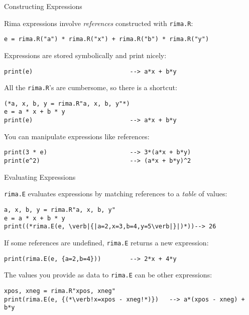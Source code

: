 \documentclass[smaller,handout]{beamer}
\begin{document}
\begin{frame}[fragile]{Constructing Expressions}

  Rima expressions involve \emph{references} constructed with \lstinline!rima.R!:
  \begin{lstlisting}
e = rima.R("a") * rima.R("x") + rima.R("b") * rima.R("y")
  \end{lstlisting}
  \pause

  Expressions are stored symbolically and print nicely:
  \begin{lstlisting}
print(e)                           --> a*x + b*y
  \end{lstlisting}
  \pause
  

  All the \lstinline!rima.R!'s are cumbersome, so there is a shortcut:
  \begin{lstlisting}
(*a, x, b, y = rima.R"a, x, b, y"*)
e = a * x + b * y
print(e)                           --> a*x + b*y
  \end{lstlisting}
  \pause

  You can manipulate expressions like references:
  \begin{lstlisting}
print(3 * e)                       --> 3*(a*x + b*y)
print(e^2)                         --> (a*x + b*y)^2
  \end{lstlisting}
\end{frame}


\begin{frame}[fragile]{Evaluating Expressions}

  \lstinline!rima.E! evaluates expressions by matching references to a \emph{table} of values:
  \begin{lstlisting}
a, x, b, y = rima.R"a, x, b, y"
e = a * x + b * y
print((*rima.E(e, \verb|{|a=2,x=3,b=4,y=5\verb|}|)*))--> 26
  \end{lstlisting}
  \pause

  If some references are undefined, \lstinline!rima.E! returns a new expression:
  \begin{lstlisting}
print(rima.E(e, {a=2,b=4}))        --> 2*x + 4*y
  \end{lstlisting}
  \pause

 The values you provide as data to \lstinline!rima.E! can be other expressions:
  \begin{lstlisting}
xpos, xneg = rima.R"xpos, xneg"
print(rima.E(e, {(*\verb!x=xpos - xneg!*)})   --> a*(xpos - xneg) + b*y
  \end{lstlisting}
\end{frame}
\end{document}
